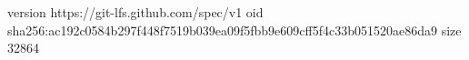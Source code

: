 version https://git-lfs.github.com/spec/v1
oid sha256:ac192c0584b297f448f7519b039ea09f5fbb9e609cff5f4c33b051520ae86da9
size 32864
